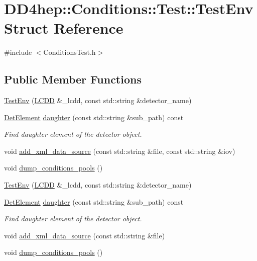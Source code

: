 \hypertarget{struct_d_d4hep_1_1_conditions_1_1_test_1_1_test_env}{}\section{D\+D4hep\+:\+:Conditions\+:\+:Test\+:\+:Test\+Env Struct Reference}
\label{struct_d_d4hep_1_1_conditions_1_1_test_1_1_test_env}


{\ttfamily \#include $<$Conditions\+Test.\+h$>$}

\subsection*{Public Member Functions}
\begin{DoxyCompactItemize}
\item 
\hyperlink{struct_d_d4hep_1_1_conditions_1_1_test_1_1_test_env_aff745acacf911b4d00b75b7b40816d68}{Test\+Env} (\hyperlink{class_d_d4hep_1_1_geometry_1_1_l_c_d_d}{L\+C\+DD} \&\+\_\+lcdd, const std\+::string \&detector\+\_\+name)
\item 
\hyperlink{class_d_d4hep_1_1_geometry_1_1_det_element}{Det\+Element} \hyperlink{struct_d_d4hep_1_1_conditions_1_1_test_1_1_test_env_a44d36687a11a397c8ca7121b126d85b6}{daughter} (const std\+::string \&sub\+\_\+path) const
\begin{DoxyCompactList}\small\item\em Find daughter element of the detector object. \end{DoxyCompactList}\item 
void \hyperlink{struct_d_d4hep_1_1_conditions_1_1_test_1_1_test_env_a4ab672dbbb8f7eedbb3cbb62439fd29b}{add\+\_\+xml\+\_\+data\+\_\+source} (const std\+::string \&file, const std\+::string \&iov)
\item 
void \hyperlink{struct_d_d4hep_1_1_conditions_1_1_test_1_1_test_env_a2140fd3bd795ea5f7f3fdcb9d3963d9c}{dump\+\_\+conditions\+\_\+pools} ()
\item 
\hyperlink{struct_d_d4hep_1_1_conditions_1_1_test_1_1_test_env_a65ece677c712504466503c346b7c86ec}{Test\+Env} (\hyperlink{class_d_d4hep_1_1_geometry_1_1_l_c_d_d}{L\+C\+DD} \&\+\_\+lcdd, const std\+::string \&detector\+\_\+name)
\item 
\hyperlink{class_d_d4hep_1_1_geometry_1_1_det_element}{Det\+Element} \hyperlink{struct_d_d4hep_1_1_conditions_1_1_test_1_1_test_env_a77ad534bcc9fa4e203fff625bedefa7e}{daughter} (const std\+::string \&sub\+\_\+path) const
\begin{DoxyCompactList}\small\item\em Find daughter element of the detector object. \end{DoxyCompactList}\item 
void \hyperlink{struct_d_d4hep_1_1_conditions_1_1_test_1_1_test_env_acad16b889cd6bbf38177f59e34ec8631}{add\+\_\+xml\+\_\+data\+\_\+source} (const std\+::string \&file)
\item 
void \hyperlink{struct_d_d4hep_1_1_conditions_1_1_test_1_1_test_env_aa74188c37deebb75495bbdb2964d2228}{dump\+\_\+conditions\+\_\+pools} ()
\end{DoxyCompactItemize}
